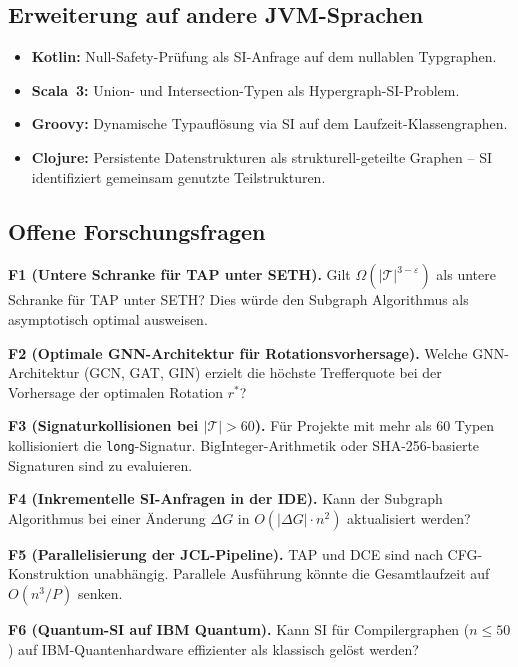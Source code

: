 ﻿\documentclass[a4paper,12pt]{article}
\theoremstyle{definition}
\begin{document}
\subsection{Erweiterung auf andere JVM-Sprachen}

\begin{itemize}
    \item \textbf{Kotlin:} Null-Safety-Pr\"ufung als SI-Anfrage auf
          dem nullablen Typgraphen.
    \item \textbf{Scala~3:} Union- und Intersection-Typen als
          Hypergraph-SI-Problem.
    \item \textbf{Groovy:} Dynamische Typaufl\"osung via SI auf
          dem Laufzeit-Klassengraphen.
    \item \textbf{Clojure:} Persistente Datenstrukturen als
          strukturell-geteilte Graphen -- SI identifiziert gemeinsam
          genutzte Teilstrukturen.
\end{itemize}

\subsection{Offene Forschungsfragen}

\textbf{F1 (Untere Schranke f\"ur TAP unter SETH).}
Gilt $\Omega(|\mathcal{T}|^{3-\varepsilon})$ als untere Schranke
f\"ur TAP unter SETH?  Dies w\"urde den Subgraph Algorithmus als
asymptotisch optimal ausweisen.

\textbf{F2 (Optimale GNN-Architektur f\"ur Rotationsvorhersage).}
Welche GNN-Architektur (GCN, GAT, GIN) erzielt die h\"ochste
Trefferquote bei der Vorhersage der optimalen Rotation $r^*$?

\textbf{F3 (Signaturkollisionen bei $|\mathcal{T}| > 60$).}
F\"ur Projekte mit mehr als 60 Typen kollisioniert die
\texttt{long}-Signatur.  BigInteger-Arithmetik oder SHA-256-basierte
Signaturen sind zu evaluieren.

\textbf{F4 (Inkrementelle SI-Anfragen in der IDE).}
Kann der Subgraph Algorithmus bei einer \"Anderung $\Delta G$ in
$O(|\Delta G| \cdot n^2)$ aktualisiert werden?

\textbf{F5 (Parallelisierung der JCL-Pipeline).}
TAP und DCE sind nach CFG-Konstruktion unabh\"angig.  Parallele
Ausf\"uhrung k\"onnte die Gesamtlaufzeit auf $O(n^3 / P)$ senken.

\textbf{F6 (Quantum-SI auf IBM Quantum).}
Kann SI f\"ur Compilergraphen ($n \leq 50$) auf IBM-Quantenhardware
effizienter als klassisch gel\"ost werden?
\end{document}
